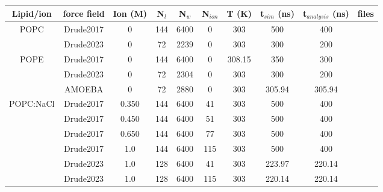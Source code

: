 \documentclass[journal=jacsat,manuscript=article,layout=singlecolumn]{achemso}
\begin{document}
\newpage
\begin{table}[]
\begin{small}
\begin{tabular}{cccccccccc}
	Lipid/ion                & force field  & Ion (M) & N$_{l}$ & N$_{w}$ & N$_{ion}$ & T (K) & t$_{sim}$ (ns) & t$_{analysis}$ (ns) & files \\ \hline
\multirow{2}{*}{POPC}            & Drude2017 & 0      & 144       & 6400       & 0         & 303    & 500              & 400         &          \cite{kav_batuhan_2021_7607436}    \\ 
                                 & Drude2023 & 0      & 72       & 2239       & 0         & 303      & 300              & 200         &          \cite{kav_batuhan_2023_7916287, richard_m_venable_2023_7871949}    \\ \hline
\multirow{3}{*}{POPE}                              & Drude2017 & 0      & 144       & 6400       & 0         & 308.15    & 350              & 300         &          \cite{kav_batuhan_2021_7604627}    \\                                            & Drude2023 & 0       & 72        & 2304      &  0         & 303    & 300             & 200         &           \cite{richard_m_venable_2023_7872447,kav_batuhan_2023_7916494} \\
                                                  & AMOEBA     & 0       & 72        & 2880      &  0        & 303     & 305.94          & 305.94      & \cite{kav_batuhan_2023_7622838} \\ \hline
	\multirow{5}{*}{POPC:NaCl}        & Drude2017 & 0.350   & 144      & 6400     & 41         & 303   & 500             & 400                  & \cite{kav_batuhan_2020_7586915}   \\
				  & Drude2017 & 0.450   & 144      & 6400     & 51         & 303   & 500             & 400                  & \cite{kav_batuhan_2020_7591753}   \\
				  & Drude2017 & 0.650   & 144      & 6400     & 77         & 303   & 500             & 400                  & \cite{kav_batuhan_2020_7596011}   \\
				  & Drude2017 & 1.0     & 144      & 6400     & 115        & 303   & 500             & 400                  & \cite{kav_batuhan_2020_7600326}   \\ 
                    & Drude2023 & 1.0      & 128       & 6400      & 41          & 303    & 223.97      &       220.14       & \cite{kav_batuhan_2023_8000095} \\     
                    & Drude2023 & 1.0      & 128       & 6400      & 115          & 303    & 220.14      &       220.14       & \cite{kav_batuhan_2023_8000133} \\ \hline
                    

\end{tabular}
\end{small}
\end{table}
\end{document}

